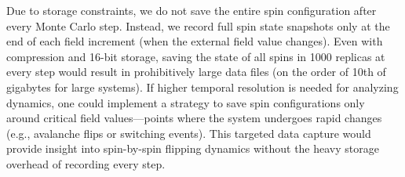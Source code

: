 \documentclass[journal=nalefd,manuscript=letter]{achemso}
\begin{document}
Due to storage constraints, we do not save the entire spin configuration after every Monte Carlo step. Instead, we record full spin state snapshots only at the end of each field increment (when the external field value changes). Even with compression and 16-bit storage, saving the state of all spins in 1000 replicas at every step would result in prohibitively large data files (on the order of 10th of gigabytes for large systems). If higher temporal resolution is needed for analyzing dynamics, one could implement a strategy to save spin configurations only around critical field values—points where the system undergoes rapid changes (e.g., avalanche flips or switching events). This targeted data capture would provide insight into spin-by-spin flipping dynamics without the heavy storage overhead of recording every step.
\end{document}
